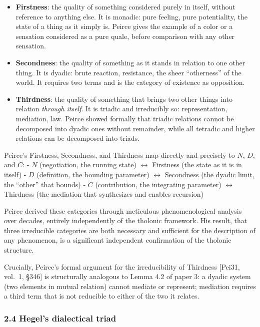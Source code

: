 \documentclass[
  11pt,
  letterpaper,
]{article}
\providecommand{\tightlist}{%
  \setlength{\itemsep}{0pt}\setlength{\parskip}{0pt}}
\begin{document}
\begin{itemize}
\tightlist
\item
  \textbf{Firstness}: the quality of something considered purely in
  itself, without reference to anything else. It is monadic: pure
  feeling, pure potentiality, the state of a thing as it simply is.
  Peirce gives the example of a color or a sensation considered as a
  pure quale, before comparison with any other sensation.
\item
  \textbf{Secondness}: the quality of something as it stands in relation
  to one other thing. It is dyadic: brute reaction, resistance, the
  sheer ``otherness'' of the world. It requires two terms and is the
  category of existence as opposition.
\item
  \textbf{Thirdness}: the quality of something that brings two other
  things into relation \emph{through itself}. It is triadic and
  irreducibly so: representation, mediation, law. Peirce showed formally
  that triadic relations cannot be decomposed into dyadic ones without
  remainder, while all tetradic and higher relations can be decomposed
  into triads.
\end{itemize}

Peirce's Firstness, Secondness, and Thirdness map directly and precisely
to \(N\), \(D\), and \(C\): - \(N\) (negotiation, the running state)
\(\leftrightarrow\) Firstness (the state as it is in itself) - \(D\)
(definition, the bounding parameter) \(\leftrightarrow\) Secondness (the
dyadic limit, the ``other'' that bounds) - \(C\) (contribution, the
integrating parameter) \(\leftrightarrow\) Thirdness (the mediation that
synthesizes and enables recursion)

Peirce derived these categories through meticulous phenomenological
analysis over decades, entirely independently of the tholonic framework.
His result, that three irreducible categories are both necessary and
sufficient for the description of any phenomenon, is a significant
independent confirmation of the tholonic structure.

Crucially, Peirce's formal argument for the irreducibility of Thirdness
{[}Pei31, vol.~1, §346{]} is structurally analogous to Lemma 4.2 of
paper 3: a dyadic system (two elements in mutual relation) cannot
mediate or represent; mediation requires a third term that is not
reducible to either of the two it relates.

\subsubsection{2.4 Hegel's dialectical
triad}\label{hegels-dialectical-triad}
\end{document}

